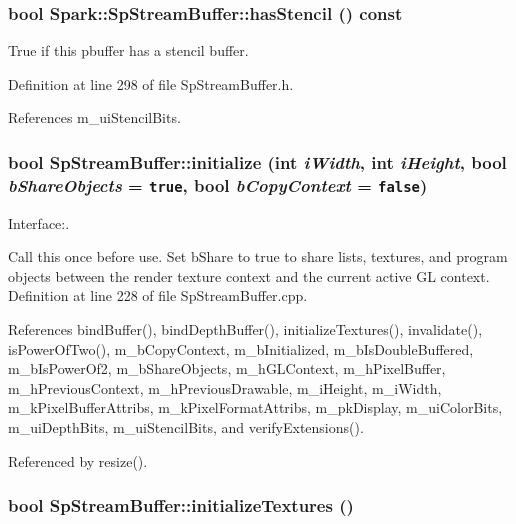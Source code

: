 \subsubsection{\setlength{\rightskip}{0pt plus 5cm}bool Spark::Sp\-Stream\-Buffer::has\-Stencil () const\hspace{0.3cm}{\tt  [inline]}}\label{classSpark_1_1SpStreamBuffer_a37}


True if this pbuffer has a stencil buffer. 

Definition at line 298 of file Sp\-Stream\-Buffer.h.

References m\_\-ui\-Stencil\-Bits.
\subsubsection{\setlength{\rightskip}{0pt plus 5cm}bool Sp\-Stream\-Buffer::initialize (int {\em i\-Width}, int {\em i\-Height}, bool {\em b\-Share\-Objects} = {\tt true}, bool {\em b\-Copy\-Context} = {\tt false})}\label{classSpark_1_1SpStreamBuffer_a2}


Interface:. 

Call this once before use. Set b\-Share to true to share lists, textures, and program objects between the render texture context and the current active GL context. Definition at line 228 of file Sp\-Stream\-Buffer.cpp.

References bind\-Buffer(), bind\-Depth\-Buffer(), initialize\-Textures(), invalidate(), is\-Power\-Of\-Two(), m\_\-b\-Copy\-Context, m\_\-b\-Initialized, m\_\-b\-Is\-Double\-Buffered, m\_\-b\-Is\-Power\-Of2, m\_\-b\-Share\-Objects, m\_\-h\-GLContext, m\_\-h\-Pixel\-Buffer, m\_\-h\-Previous\-Context, m\_\-h\-Previous\-Drawable, m\_\-i\-Height, m\_\-i\-Width, m\_\-k\-Pixel\-Buffer\-Attribs, m\_\-k\-Pixel\-Format\-Attribs, m\_\-pk\-Display, m\_\-ui\-Color\-Bits, m\_\-ui\-Depth\-Bits, m\_\-ui\-Stencil\-Bits, and verify\-Extensions().

Referenced by resize().
\subsubsection{\setlength{\rightskip}{0pt plus 5cm}bool Sp\-Stream\-Buffer::initialize\-Textures ()\hspace{0.3cm}{\tt  [protected]}}\label{classSpark_1_1SpStreamBuffer_b5}


